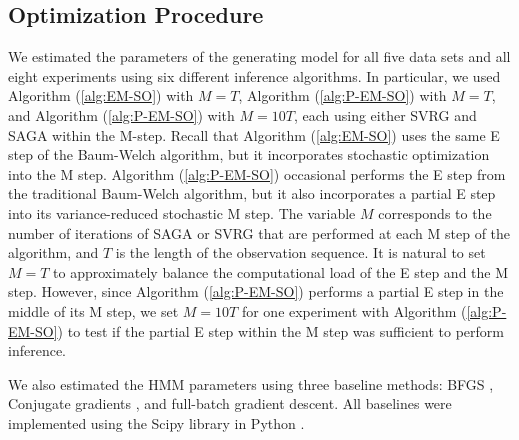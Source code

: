 \subsection{Optimization Procedure}

We estimated the parameters of the generating model for all five data sets and all eight experiments using six different inference algorithms. In particular, we used Algorithm (\ref{alg:EM-SO}) with $M=T$, Algorithm (\ref{alg:P-EM-SO}) with $M=T$, and Algorithm (\ref{alg:P-EM-SO}) with $M=10T$, each using either SVRG and SAGA within the M-step. Recall that Algorithm (\ref{alg:EM-SO}) uses the same E step of the Baum-Welch algorithm, but it incorporates stochastic optimization into the M step. Algorithm (\ref{alg:P-EM-SO}) occasional performs the E step from the traditional Baum-Welch algorithm, but it also incorporates a partial E step into its variance-reduced stochastic M step. The variable $M$ corresponds to the number of iterations of SAGA or SVRG that are performed at each M step of the algorithm, and $T$ is the length of the observation sequence. It is natural to set $M=T$ to approximately balance the computational load of the E step and the M step. However, since Algorithm (\ref{alg:P-EM-SO}) performs a partial E step in the middle of its M step, we set $M=10T$ for one experiment with Algorithm (\ref{alg:P-EM-SO}) to test if the partial E step within the M step was sufficient to perform inference.

We also estimated the HMM parameters using three baseline methods: BFGS \citep{Fletcher:2000}, Conjugate gradients \citep{Fletcher:1964}, and full-batch gradient descent.
%
All baselines were implemented using the Scipy library in Python \citep{Virtanen:2019}.

